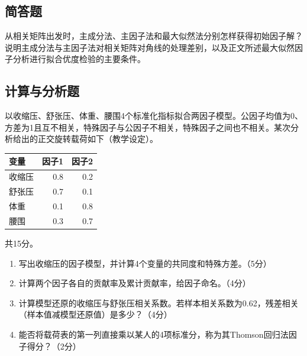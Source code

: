 \par\addvspace{6pt}\noindent\begin{minipage}{\linewidth}

\subsection{简答题}


从相关矩阵出发时，主成分法、主因子法和最大似然法分别怎样获得初始因子解？说明主成分法与主因子法对相关矩阵对角线的处理差别，以及正文所述最大似然因子分析进行拟合优度检验的主要条件。



\end{minipage}\par\vspace{4pt}

\par\addvspace{6pt}\noindent\begin{minipage}{\linewidth}

\subsection{计算与分析题}


以收缩压、舒张压、体重、腰围4个标准化指标拟合两因子模型。公因子均值为0、方差为1且互不相关，特殊因子与公因子不相关，特殊因子之间也不相关。某次分析给出的正交旋转载荷如下（教学设定）。

\begin{center}\small\setlength{\tabcolsep}{4pt}\renewcommand{\arraystretch}{1.18}\begin{tabular}{@{}lrr@{}}
\toprule
变量 & 因子1 & 因子2 \\
\midrule

收缩压 & 0.8 & 0.2 \\
舒张压 & 0.7 & 0.1 \\
体重 & 0.1 & 0.8 \\
腰围 & 0.3 & 0.7 \\
\bottomrule\end{tabular}\end{center}

共15分。

\begin{enumerate}
\def\labelenumi{\arabic{enumi}.}
\tightlist
\item
  写出收缩压的因子模型，并计算4个变量的共同度和特殊方差。（5分）
\item
  计算两个因子各自的贡献率及累计贡献率，给因子命名。（4分）
\item
  计算模型还原的收缩压与舒张压相关系数。若样本相关系数为0.62，残差相关（样本值减模型还原值）是多少？（4分）
\item
  能否将载荷表的第一列直接乘以某人的4项标准分，称为其Thomson回归法因子得分？（2分）
\end{enumerate}



\end{minipage}\par\vspace{4pt}


